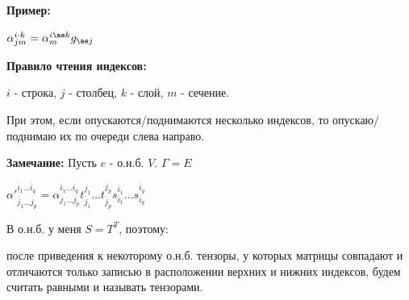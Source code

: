 \textbf{Пример:}

$\alpha^{i \cdot k}_{jm} = \alpha^{i \ae k}_m g_{\ae j}$

\textbf{Правило чтения индексов:}

$i$ - строка, $j$ - столбец, $k$ - слой, $m$ - сечение.

При этом, если опускаются/поднимаются несколько индексов, то опускаю/поднимаю их по очереди слева направо.


\textbf{Замечание:} Пусть $e$ - о.н.б. $V$. $\Gamma =E$

$\alpha'^{\overline{i}_1\ldots \overline{i}_q}_{\overline{j}_1 \ldots \overline{j}_p} = \alpha^{i_1 \ldots i_q}_{j_1\ldots j_p} t_{\overline{j}_1}^{j_1}\ldots t_{\overline{j}_p}^{j_p}s_{i_1}^{\overline{i}_1}\ldots s_{i_q}^{\overline{i}_q} $





 В о.н.б.  у меня $S = T^T$, поэтому:

после приведения к некоторому о.н.б. тензоры, у которых матрицы совпадают и отличаются только записью в расположении верхних и нижних индексов, будем считать равными и называть  тензорами.

